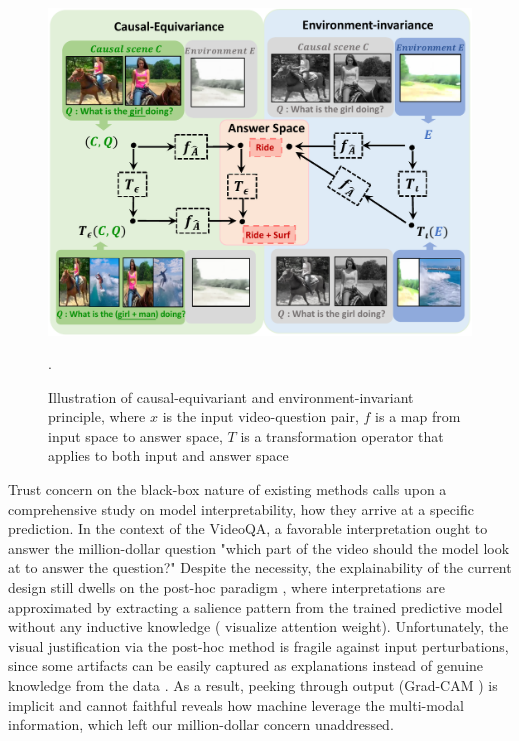 \begin{figure}[t]
\centering
\includegraphics[scale=0.53]{fig/f1.pdf}
\caption{Illustration of causal-equivariant and environment-invariant principle, where $x$ is the input video-question pair, $f$ is a map from input space to answer space, $T$ is a transformation operator that applies to both input and answer space}.
\vspace{-5pt}
\label{fig:overview}
\end{figure}



Trust concern on the black-box nature of existing methods calls upon a comprehensive study on model interpretability, \ie how they arrive at a specific prediction. 
%
In the context of the VideoQA, a favorable interpretation ought to answer the million-dollar question "which part of the video should the model look at to answer the question?" 
%
Despite the necessity, the explainability of the current design still dwells on the post-hoc paradigm \cite{gao2018motionappearance,DBLP:conf/iccv/Liu0WL21,10.1145/3474085.3475620}, where interpretations are approximated by extracting a salience pattern from the trained predictive model without any inductive knowledge ( \eg visualize attention weight).
%
Unfortunately, the visual justification via the post-hoc method is fragile against input perturbations, since some artifacts can be easily captured as explanations instead of genuine knowledge from the data \cite{DBLP:conf/ijcai/LaugelLMRD19}. As a result, peeking through output (\ie Grad-CAM \cite{DBLP:conf/iccv/SelvarajuCDVPB17}) is implicit and cannot faithful reveals how machine leverage the multi-modal information, which left our million-dollar concern unaddressed.

